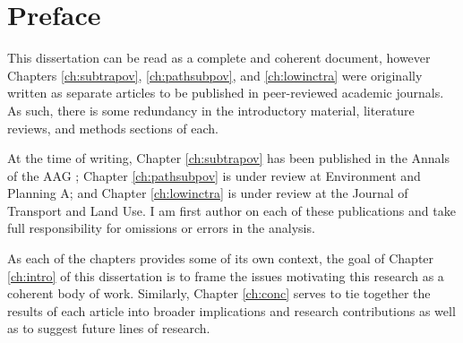 \documentclass[11 pt, letterpaper]{report}
\begin{document}
%
%
%
%
%
%
%


\newpage





\tableofcontents


\newpage







\listoffigures

\newpage



\listoftables



\hypersetup{
	colorlinks=true,
	linkcolor=red,
	citecolor=blue,
	urlcolor=blue
}



\newpage


\chapter*{Preface}


This dissertation can be read as a complete and coherent document, however Chapters \ref{ch:subtrapov}, \ref{ch:pathsubpov}, and \ref{ch:lowinctra} were originally written as separate articles to be published in peer-reviewed academic journals. As such, there is some redundancy in the introductory material, literature reviews, and methods sections of each. 

At the time of writing, Chapter \ref{ch:subtrapov} has been published in the Annals of the AAG \cite{allen_suburbanization_2021}; Chapter \ref{ch:pathsubpov} is under review at Environment and Planning A; and Chapter \ref{ch:lowinctra} is under review at the Journal of Transport and Land Use. I am first author on each of these publications and take full responsibility for omissions or errors in the analysis. 

As each of the chapters provides some of its own context, the goal of Chapter \ref{ch:intro} of this dissertation is to frame the issues motivating this research as a coherent body of work. Similarly, Chapter \ref{ch:conc} serves to tie together the results of each article into broader implications and research contributions as well as to suggest future lines of research. 
\end{document}
